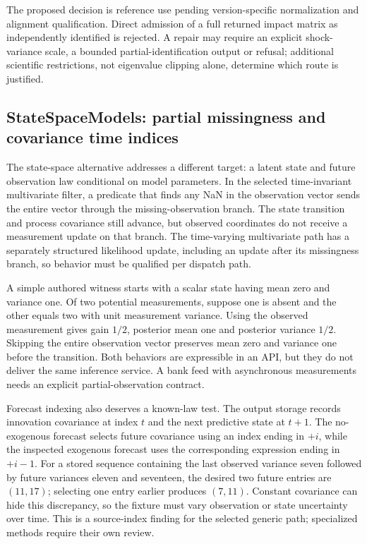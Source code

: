 The proposed decision is reference use pending version-specific normalization and alignment qualification. Direct admission of a full returned impact matrix as independently identified is rejected. A repair may require an explicit shock-variance scale, a bounded partial-identification output or refusal; additional scientific restrictions, not eigenvalue clipping alone, determine which route is justified.

\subsection{StateSpaceModels: partial missingness and covariance time indices}

The state-space alternative addresses a different target: a latent state and future observation law conditional on model parameters. In the selected time-invariant multivariate filter, a predicate that finds any NaN in the observation vector sends the entire vector through the missing-observation branch. The state transition and process covariance still advance, but observed coordinates do not receive a measurement update on that branch. The time-varying multivariate path has a separately structured likelihood update, including an update after its missingness branch, so behavior must be qualified per dispatch path.~\citep{exec25_odyn_ssm}

A simple authored witness starts with a scalar state having mean zero and variance one. Of two potential measurements, suppose one is absent and the other equals two with unit measurement variance. Using the observed measurement gives gain $1/2$, posterior mean one and posterior variance $1/2$. Skipping the entire observation vector preserves mean zero and variance one before the transition. Both behaviors are expressible in an API, but they do not deliver the same inference service. A bank feed with asynchronous measurements needs an explicit partial-observation contract.~\citep{exec25_odyn_ssm,exec25_odyn_choice}

Forecast indexing also deserves a known-law test. The output storage records innovation covariance at index $t$ and the next predictive state at $t+1$. The no-exogenous forecast selects future covariance using an index ending in $+i$, while the inspected exogenous forecast uses the corresponding expression ending in $+i-1$. For a stored sequence containing the last observed variance seven followed by future variances eleven and seventeen, the desired two future entries are $(11,17)$; selecting one entry earlier produces $(7,11)$. Constant covariance can hide this discrepancy, so the fixture must vary observation or state uncertainty over time. This is a source-index finding for the selected generic path; specialized methods require their own review.~\citep{exec25_odyn_ssm,exec25_odyn_choice}

